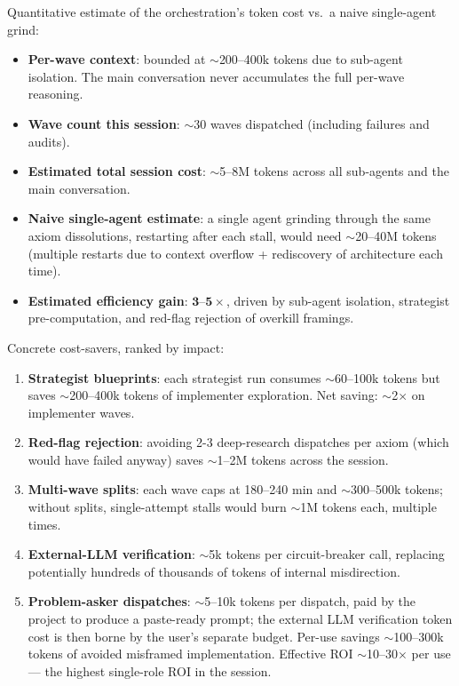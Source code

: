 \documentclass[11pt,a4paper]{article}
\theoremstyle{plain}
\theoremstyle{definition}
\begin{document}
Quantitative estimate of the orchestration's token cost vs.\ a naive
single-agent grind:

\begin{itemize}[leftmargin=1.5em]
\item \textbf{Per-wave context}: bounded at $\sim$200--400k tokens
      due to sub-agent isolation. The main conversation never
      accumulates the full per-wave reasoning.
\item \textbf{Wave count this session}: $\sim$30 waves dispatched
      (including failures and audits).
\item \textbf{Estimated total session cost}: $\sim$5--8M tokens
      across all sub-agents and the main conversation.
\item \textbf{Naive single-agent estimate}: a single agent grinding
      through the same axiom dissolutions, restarting after each
      stall, would need $\sim$20--40M tokens (multiple restarts due to
      context overflow + rediscovery of architecture each time).
\item \textbf{Estimated efficiency gain}: $\boldsymbol{3\text{--}5\times}$,
      driven by sub-agent isolation, strategist pre-computation, and
      red-flag rejection of overkill framings.
\end{itemize}

Concrete cost-savers, ranked by impact:
\begin{enumerate}[leftmargin=1.5em]
\item \textbf{Strategist blueprints}: each strategist run consumes
      $\sim$60--100k tokens but saves $\sim$200--400k tokens of
      implementer exploration. Net saving:
      $\sim$2$\times$ on implementer waves.
\item \textbf{Red-flag rejection}: avoiding 2-3 deep-research dispatches
      per axiom (which would have failed anyway) saves
      $\sim$1--2M tokens across the session.
\item \textbf{Multi-wave splits}: each wave caps at 180--240 min
      and $\sim$300--500k tokens; without splits, single-attempt
      stalls would burn $\sim$1M tokens each, multiple times.
\item \textbf{External-LLM verification}: $\sim$5k tokens per
      circuit-breaker call, replacing potentially hundreds of
      thousands of tokens of internal misdirection.
\item \textbf{Problem-asker dispatches}: $\sim$5--10k tokens per
      dispatch, paid by the project to produce a paste-ready prompt;
      the external LLM verification token cost is then borne by the
      user's separate budget. Per-use savings $\sim$100--300k tokens
      of avoided misframed implementation. Effective ROI
      $\sim$10--30$\times$ per use --- the highest single-role ROI
      in the session.
\end{enumerate}
\end{document}

